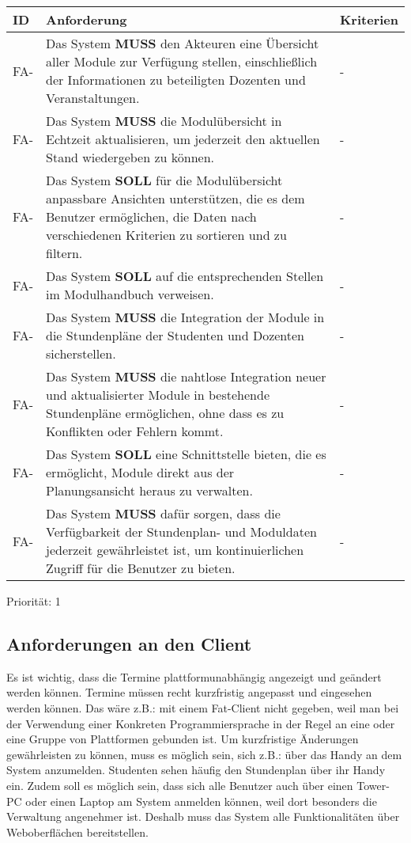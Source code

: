 \begin{tabular} {|p{}|p{11cm}|p{}|}
	\hline
	ID & Anforderung & Kriterien \\
	\hline
	FA-
	& Das System \textbf{MUSS} den Akteuren eine Übersicht aller Module zur Verfügung stellen, einschließlich der Informationen zu beteiligten Dozenten und Veranstaltungen. 
	& - \\
	\hline
	FA-
	& Das System \textbf{MUSS} die Modulübersicht in Echtzeit aktualisieren, um jederzeit den aktuellen Stand wiedergeben zu können. 
	& - \\
	\hline
	FA-
	& Das System \textbf{SOLL} für die Modulübersicht anpassbare Ansichten unterstützen, die es dem Benutzer ermöglichen, die Daten nach verschiedenen Kriterien zu sortieren und zu filtern. 
	& - \\
	\hline
	FA-
	& Das System \textbf{SOLL} auf die entsprechenden Stellen im Modulhandbuch verweisen. 
	& - \\
	\hline
	FA-
	& Das System \textbf{MUSS} die Integration der Module in die Stundenpläne der Studenten und Dozenten sicherstellen. 
	& - \\
	\hline
	FA-
	& Das System \textbf{MUSS} die nahtlose Integration neuer und aktualisierter Module in bestehende Stundenpläne ermöglichen, ohne dass es zu Konflikten oder Fehlern kommt. 
	& - \\
	\hline
	FA-
	& Das System \textbf{SOLL} eine Schnittstelle bieten, die es ermöglicht, Module direkt aus der Planungsansicht heraus zu verwalten. 
	& - \\
	\hline
	FA-
	& Das System \textbf{MUSS} dafür sorgen, dass die Verfügbarkeit der Stundenplan- und Moduldaten jederzeit gewährleistet ist, um kontinuierlichen Zugriff für die Benutzer zu bieten. 
	& - \\
	\hline
\end{tabular}
Priorität: 1

\newpage

\subsection{Anforderungen an den Client}
Es ist wichtig, dass die Termine plattformunabhängig angezeigt und geändert werden können. Termine müssen recht kurzfristig angepasst und eingesehen werden können. Das wäre z.B.: mit einem Fat-Client nicht gegeben, weil man bei der Verwendung einer Konkreten Programmiersprache in der Regel an eine oder eine Gruppe von Plattformen gebunden ist. Um kurzfristige Änderungen gewährleisten zu können, muss es möglich sein, sich z.B.: über das Handy an dem System anzumelden. Studenten sehen häufig den Stundenplan über ihr Handy ein. Zudem soll es möglich sein, dass sich alle Benutzer auch über einen Tower-PC oder einen Laptop am System anmelden können, weil dort besonders die Verwaltung angenehmer ist. Deshalb muss das System alle Funktionalitäten über Weboberflächen bereitstellen.

